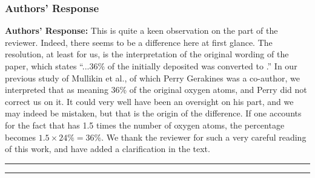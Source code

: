 \documentclass[12pt]{article}
\newcommand{\responselabel}{\textbf{\textcolor{responseframe}{Authors' Response:}}}
\begin{document}
\subsubsection{Authors' Response}
\begin{responsebox}
\responselabel{} This is quite a keen observation on the part of the reviewer. Indeed, there seems to be a difference here at first glance. The resolution, at least for us, is the interpretation of the original wording of the paper, which states ``...36\% of the initially deposited  was converted to .'' In our previous study of Mullikin et al., of which Perry Gerakines was a co-author, we interpreted that as meaning 36\% of the original oxygen atoms, and Perry did not correct us on it. It could very well have been an oversight on his part, and we may indeed be mistaken, but that is the origin of the difference. If one accounts for the fact that  has 1.5 times the number of oxygen atoms, the percentage becomes $1.5\times24\%=36\%$. We thank the reviewer for such a very careful reading of this work, and have added a clarification in the text. 
\end{responsebox}

\bigskip
\hrule
\bigskip


\bigskip
\hrule
\bigskip
\end{document}
